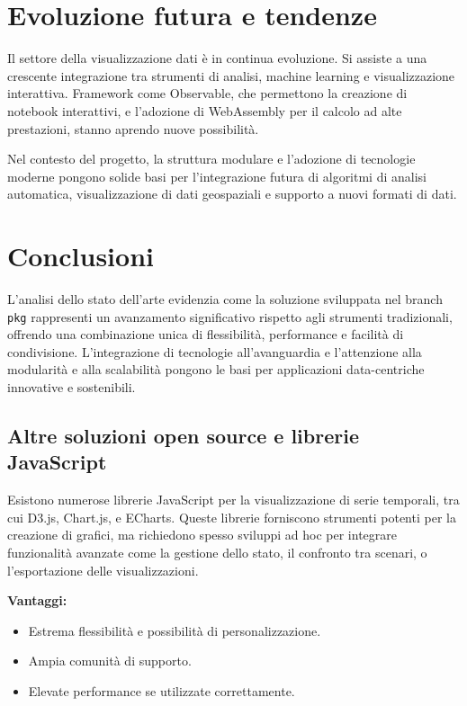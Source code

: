 \section{Evoluzione futura e tendenze}

Il settore della visualizzazione dati è in continua evoluzione. Si assiste a una crescente integrazione tra strumenti di analisi, machine learning e visualizzazione interattiva. Framework come Observable, che permettono la creazione di notebook interattivi, e l'adozione di WebAssembly per il calcolo ad alte prestazioni, stanno aprendo nuove possibilità.

Nel contesto del progetto, la struttura modulare e l'adozione di tecnologie moderne pongono solide basi per l'integrazione futura di algoritmi di analisi automatica, visualizzazione di dati geospaziali e supporto a nuovi formati di dati.

\section{Conclusioni}

L'analisi dello stato dell'arte evidenzia come la soluzione sviluppata nel branch \texttt{pkg} rappresenti un avanzamento significativo rispetto agli strumenti tradizionali, offrendo una combinazione unica di flessibilità, performance e facilità di condivisione. L'integrazione di tecnologie all'avanguardia e l'attenzione alla modularità e alla scalabilità pongono le basi per applicazioni data-centriche innovative e sostenibili.



\subsection{Altre soluzioni open source e librerie JavaScript}

Esistono numerose librerie JavaScript per la visualizzazione di serie temporali, tra cui D3.js, Chart.js, e ECharts. Queste librerie forniscono strumenti potenti per la creazione di grafici, ma richiedono spesso sviluppi ad hoc per integrare funzionalità avanzate come la gestione dello stato, il confronto tra scenari, o l’esportazione delle visualizzazioni.

\textbf{Vantaggi:}
\begin{itemize}
    \item Estrema flessibilità e possibilità di personalizzazione.
    \item Ampia comunità di supporto.
    \item Elevate performance se utilizzate correttamente.
\end{itemize}

